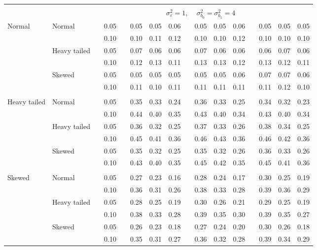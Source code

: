 \documentclass{article} %
\begin{document}
\begin{table}[ht]
\begin{scriptsize}
\begin{center}
\begin{tabular}{ll p{.1cm} c p{.1cm} rrr p{.1cm} rrr p{.1cm} rrr}
&&&&&&&&&&&&&&&\\
& && && \multicolumn{9}{c}{$\sigma_{\varepsilon}^2 = 1$, \ \ $\sigma_{b_0}^2 = \sigma_{b_1}^2 = 4$} \\ \cline{6-16}
\rowcolor{gray!20}Normal       & Normal       && 0.05 &&   0.05 & 0.05 & 0.06 && 0.05 & 0.05 & 0.06 &&  0.05 & 0.05 & 0.05 \\
\rowcolor{gray!20}             &              && 0.10 &&   0.10 & 0.11 & 0.12 && 0.10 & 0.10 & 0.12 &&  0.10 & 0.10 & 0.10 \\
\rowcolor{gray!20}             & Heavy tailed && 0.05 &&   0.07 & 0.06 & 0.06 && 0.07 & 0.06 & 0.06 &&  0.06 & 0.07 & 0.06 \\
\rowcolor{gray!20}             &              && 0.10 &&   0.12 & 0.13 & 0.11 && 0.13 & 0.13 & 0.12 &&  0.13 & 0.12 & 0.11 \\
\rowcolor{gray!20}             & Skewed       && 0.05 &&   0.05 & 0.05 & 0.05 && 0.05 & 0.05 & 0.06 &&  0.07 & 0.07 & 0.06 \\
\rowcolor{gray!20}             &              && 0.10 &&   0.11 & 0.10 & 0.11 && 0.11 & 0.11 & 0.11 &&  0.11 & 0.12 & 0.10 \\
             &&&&&&&&&&&&&&&\\
Heavy tailed & Normal       && 0.05 &&   0.35 & 0.33 & 0.24 && 0.36 & 0.33 & 0.25 && 0.34 & 0.32 & 0.23 \\
             &              && 0.10 &&   0.44 & 0.40 & 0.35 && 0.43 & 0.40 & 0.34 && 0.43 & 0.40 & 0.34 \\
             & Heavy tailed && 0.05 &&   0.36 & 0.32 & 0.25 && 0.37 & 0.33 & 0.26 && 0.38 & 0.34 & 0.25 \\
             &              && 0.10 &&   0.45 & 0.41 & 0.36 && 0.46 & 0.43 & 0.36 && 0.46 & 0.42 & 0.36 \\
             & Skewed       && 0.05 &&   0.35 & 0.32 & 0.25 && 0.35 & 0.32 & 0.26 && 0.36 & 0.33 & 0.26 \\
             &              && 0.10 &&   0.43 & 0.40 & 0.35 && 0.45 & 0.42 & 0.35 && 0.45 & 0.41 & 0.36 \\
             &&&&&&&&&&&&&&&\\
Skewed       & Normal       && 0.05 &&   0.27 & 0.23 & 0.16 && 0.28 & 0.24 & 0.17 && 0.30 & 0.25 & 0.19 \\
             &              && 0.10 &&   0.36 & 0.31 & 0.26 && 0.38 & 0.33 & 0.28 && 0.39 & 0.36 & 0.29 \\
             & Heavy tailed && 0.05 &&   0.28 & 0.25 & 0.19 && 0.30 & 0.26 & 0.21 && 0.29 & 0.25 & 0.19 \\
             &              && 0.10 &&   0.38 & 0.33 & 0.28 && 0.39 & 0.35 & 0.30 && 0.39 & 0.35 & 0.27 \\
             & Skewed       && 0.05 &&   0.26 & 0.23 & 0.18 && 0.27 & 0.24 & 0.20 && 0.30 & 0.26 & 0.18 \\
             &              && 0.10 &&   0.35 & 0.31 & 0.27 && 0.36 & 0.32 & 0.28 && 0.39 & 0.34 & 0.29 \\


\end{tabular}
\end{center}
\end{scriptsize}
\end{table}
\end{document}
